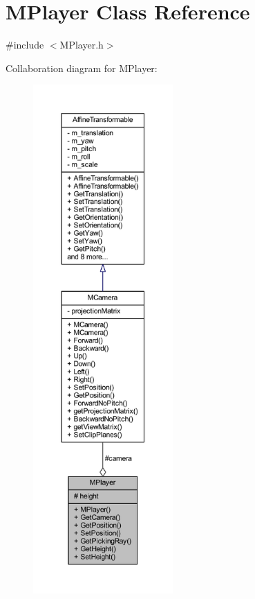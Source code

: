 \hypertarget{class_m_player}{}\section{M\+Player Class Reference}
\label{class_m_player}


{\ttfamily \#include $<$M\+Player.\+h$>$}



Collaboration diagram for M\+Player\+:\nopagebreak
\begin{figure}[H]
\begin{center}
\leavevmode
\includegraphics[height=550pt]{class_m_player__coll__graph}
\end{center}
\end{figure}
